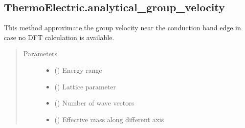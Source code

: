 \documentclass[letterpaper,10pt,english]{sphinxmanual}
\begin{document}
\subsection{ThermoElectric.analytical\_group\_velocity}
\label{\detokenize{autosummary/ThermoElectric.analytical_group_velocity:thermoelectric-analytical-group-velocity}}\label{\detokenize{autosummary/ThermoElectric.analytical_group_velocity::doc}}

\begin{fulllineitems}
\label{\detokenize{autosummary/ThermoElectric.analytical_group_velocity:ThermoElectric.analytical_group_velocity}}
\sphinxAtStartPar
This method approximate the group velocity near the conduction band edge
in case no DFT calculation is available.
\begin{quote}\begin{description}
\item[{Parameters}] \leavevmode\begin{itemize}
\item {} 
\sphinxAtStartPar
{} () \textendash{} Energy range

\item {} 
\sphinxAtStartPar
{} () \textendash{} Lattice parameter

\item {} 
\sphinxAtStartPar
{} () \textendash{} Number of wave vectors

\item {} 
\sphinxAtStartPar
{} () \textendash{} Effective mass along different axis


\end{itemize}
\end{description}
\end{quote}
\end{fulllineitems}
\end{document}
